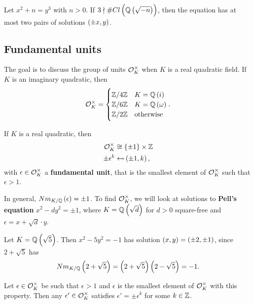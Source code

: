 \begin{remark*}
Let $ x^2 + n = y^3 $ with $ n > 0 $. If $ 3 \nmid \#Cl\br{\Q\br{\sqrt{-n}}} $, then the equation has at most two pairs of solutions $ \br{\pm x, y} $.
\end{remark*}

\pagebreak

\subsection{Fundamental units}


The goal is to discuss the group of units $ \mathcal{O}_K^\times $ when $ K $ is a real quadratic field. If $ K $ is an imaginary quadratic, then
$$ \OO_K^\times =
\begin{cases}
\Z / 4\Z & K = \Q\br{i} \\
\Z / 6\Z & K = \Q\br{\omega} \\
\Z / 2\Z & \text{otherwise}
\end{cases}.
$$

\begin{theorem}
If $ K $ is a real quadratic, then
\begin{align*}
\OO_K^\times & \cong \cbr{\pm 1} \times \Z \\
\pm\epsilon^k & \mapsfrom \br{\pm 1, k},
\end{align*}
with $ \epsilon \in \mathcal{O}_K^\times $ a \textbf{fundamental unit}, that is the smallest element of $ \mathcal{O}_K^\times $ such that $ \epsilon > 1 $.
\end{theorem}

In general, $ Nm_{K / \Q}\br{\epsilon} = \pm 1 $. To find $ \mathcal{O}_K^\times $, we will look at solutions to \textbf{Pell's equation} $ x^2 - dy^2 = \pm 1 $, where $ K = \Q\br{\sqrt{d}} $ for $ d > 0 $ square-free and $ \epsilon = x + \sqrt{d} \cdot y $.

\begin{example*}
Let $ K = \Q\br{\sqrt{5}} $. Then $ x^2 - 5y^2 = -1 $ has solution $ \br{x, y} = \br{\pm 2, \pm 1} $, since $ 2 + \sqrt{5} $ has
$$ Nm_{K / \Q}\br{2 + \sqrt{5}} = \br{2 + \sqrt{5}}\br{2 - \sqrt{5}} = -1. $$
\end{example*}

\begin{lemma}
Let $ \epsilon \in \mathcal{O}_K^\times $ be such that $ \epsilon > 1 $ and $ \epsilon $ is the smallest element of $ \mathcal{O}_K^\times $ with this property. Then any $ \epsilon' \in \mathcal{O}_K^\times $ satisfies $ \epsilon' = \pm\epsilon^k $ for some $ k \in \mathbb{Z} $.
\end{lemma}

